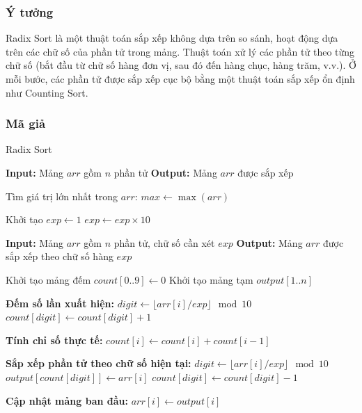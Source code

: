 \subsubsection{Ý tưởng}
Radix Sort là một thuật toán sắp xếp không dựa trên so sánh, hoạt động dựa trên các chữ số của phần tử trong mảng. Thuật toán xử lý các phần tử theo từng chữ số (bắt đầu từ chữ số hàng đơn vị, sau đó đến hàng chục, hàng trăm, v.v.). Ở mỗi bước, các phần tử được sắp xếp cục bộ bằng một thuật toán sắp xếp ổn định như Counting Sort. \cite{drozdek2023}

\subsubsection{Mã giả}

\begin{algorithm}[H]
\caption{Radix Sort}
\begin{algorithmic}[1]
    \State \textbf{Input:} Mảng $arr$ gồm $n$ phần tử
    \State \textbf{Output:} Mảng $arr$ được sắp xếp
    
    \State Tìm giá trị lớn nhất trong $arr$: $max \gets \max(arr)$
    
    \State Khởi tạo $exp \gets 1$ 
        \State {} 
        \State $exp \gets exp \times 10$
    \EndWhile
\EndProcedure

    \State \textbf{Input:} Mảng $arr$ gồm $n$ phần tử, chữ số cần xét $exp$
    \State \textbf{Output:} Mảng $arr$ được sắp xếp theo chữ số hàng $exp$
    
    \State Khởi tạo mảng đếm $count[0..9] \gets 0$
    \State Khởi tạo mảng tạm $output[1..n]$
    
    \State \textbf{Đếm số lần xuất hiện:}
        \State $digit \gets \lfloor arr[i] / exp \rfloor \mod 10$
        \State $count[digit] \gets count[digit] + 1$
    \EndFor
    
    \State \textbf{Tính chỉ số thực tế:}
        \State $count[i] \gets count[i] + count[i-1]$
    \EndFor
    
    \State \textbf{Sắp xếp phần tử theo chữ số hiện tại:}
        \State $digit \gets \lfloor arr[i] / exp \rfloor \mod 10$
        \State $output[count[digit]] \gets arr[i]$
        \State $count[digit] \gets count[digit] - 1$
    \EndFor
    
    \State \textbf{Cập nhật mảng ban đầu:}
        \State $arr[i] \gets output[i]$
    \EndFor
\EndProcedure
\end{algorithmic}
\end{algorithm}

